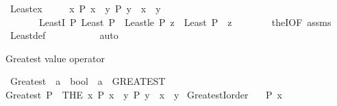 \begin{isabellebody}
\endisatagproof
{\isafoldproof}%
%
\isadelimproof
\isanewline
%
\endisadelimproof
\isanewline
{}\isamarkupfalse%
\ Least{\isacharunderscore}{\kern0pt}ex{}{\isacharcolon}{\kern0pt}\isanewline
\ \ \ \ \ {\isachardoublequoteopen}{\isasymexists}{\isacharbang}{\kern0pt}x{\isachardot}{\kern0pt}\ P\ x\ {\isasymand}\ {\isacharparenleft}{\kern0pt}{\isasymforall}y{\isachardot}{\kern0pt}\ P\ y\ {\isasymlongrightarrow}\ x\ {\isasymle}\ y{\isacharparenright}{\kern0pt}{\isachardoublequoteclose}\isanewline
\ \ \ \ \ \ \ Least{}I{\isacharcolon}{\kern0pt}\ {\isachardoublequoteopen}P\ {\isacharparenleft}{\kern0pt}Least\ P{\isacharparenright}{\kern0pt}{\isachardoublequoteclose}\ \ Least{}{\isacharunderscore}{\kern0pt}le{\isacharcolon}{\kern0pt}\ {\isachardoublequoteopen}P\ z\ {\isasymLongrightarrow}\ Least\ P\ {\isasymle}\ z{\isachardoublequoteclose}\isanewline
%
\isadelimproof
\ \ %
\endisadelimproof
%
\isatagproof
{}\isamarkupfalse%
\ \ \ \ \ theI{\isacharprime}{\kern0pt}{\isacharbrackleft}{\kern0pt}OF\ assms{\isacharbrackright}{\kern0pt}\isanewline
\ \ \isamarkupfalse%
\ Least{\isacharunderscore}{\kern0pt}def\isanewline
\ \ \isamarkupfalse%
\ \ \ \ \ \ \ \ auto%
\endisatagproof
{\isafoldproof}%
%
\isadelimproof
%
\endisadelimproof
%
\begin{isamarkuptext}%
Greatest value operator%
\end{isamarkuptext}\isamarkuptrue%
\isamarkupfalse%
\ Greatest\ {\isacharcolon}{\kern0pt}{\isacharcolon}{\kern0pt}\ {\isachardoublequoteopen}{\isacharparenleft}{\kern0pt}{\isacharprime}{\kern0pt}a\ {\isasymRightarrow}\ bool{\isacharparenright}{\kern0pt}\ {\isasymRightarrow}\ {\isacharprime}{\kern0pt}a{\isachardoublequoteclose}\ {\isacharparenleft}{\kern0pt}\ {\isachardoublequoteopen}GREATEST\ {\isachardoublequoteclose}\ {}{}{\isacharparenright}{\kern0pt}\ \isanewline
{\isachardoublequoteopen}Greatest\ P\ {\isacharequal}{\kern0pt}\ {\isacharparenleft}{\kern0pt}THE\ x{\isachardot}{\kern0pt}\ P\ x\ {\isasymand}\ {\isacharparenleft}{\kern0pt}{\isasymforall}y{\isachardot}{\kern0pt}\ P\ y\ {\isasymlongrightarrow}\ x\ {\isasymge}\ y{\isacharparenright}{\kern0pt}{\isacharparenright}{\kern0pt}{\isachardoublequoteclose}\isanewline
\isanewline
{}\isamarkupfalse%
\ GreatestI{}{\isacharunderscore}{\kern0pt}order{\isacharcolon}{\kern0pt}\isanewline
\ \ {\isachardoublequoteopen}{\isasymlbrakk}\ P\ x{\isacharsemicolon}{\kern0pt}\isanewline

\end{isabellebody}
